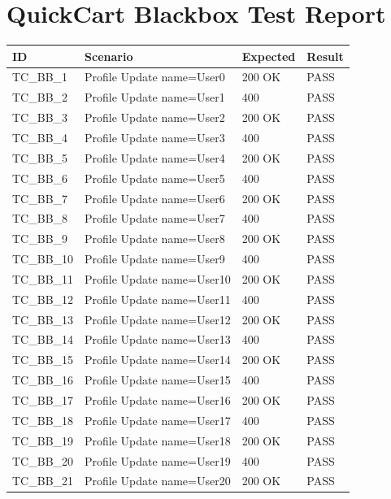 \documentclass{article}
\begin{document}
\section*{QuickCart Blackbox Test Report}

\begin{longtable}{|p{2cm}|p{8cm}|p{3cm}|p{2cm}|}
\hline
\textbf{ID} & \textbf{Scenario} & \textbf{Expected} & \textbf{Result} \\
\hline
\endhead
TC\_BB\_1 & Profile Update name=User0 & 200 OK & PASS \\
\hline
TC\_BB\_2 & Profile Update name=User1 & 400 & PASS \\
\hline
TC\_BB\_3 & Profile Update name=User2 & 200 OK & PASS \\
\hline
TC\_BB\_4 & Profile Update name=User3 & 400 & PASS \\
\hline
TC\_BB\_5 & Profile Update name=User4 & 200 OK & PASS \\
\hline
TC\_BB\_6 & Profile Update name=User5 & 400 & PASS \\
\hline
TC\_BB\_7 & Profile Update name=User6 & 200 OK & PASS \\
\hline
TC\_BB\_8 & Profile Update name=User7 & 400 & PASS \\
\hline
TC\_BB\_9 & Profile Update name=User8 & 200 OK & PASS \\
\hline
TC\_BB\_10 & Profile Update name=User9 & 400 & PASS \\
\hline
TC\_BB\_11 & Profile Update name=User10 & 200 OK & PASS \\
\hline
TC\_BB\_12 & Profile Update name=User11 & 400 & PASS \\
\hline
TC\_BB\_13 & Profile Update name=User12 & 200 OK & PASS \\
\hline
TC\_BB\_14 & Profile Update name=User13 & 400 & PASS \\
\hline
TC\_BB\_15 & Profile Update name=User14 & 200 OK & PASS \\
\hline
TC\_BB\_16 & Profile Update name=User15 & 400 & PASS \\
\hline
TC\_BB\_17 & Profile Update name=User16 & 200 OK & PASS \\
\hline
TC\_BB\_18 & Profile Update name=User17 & 400 & PASS \\
\hline
TC\_BB\_19 & Profile Update name=User18 & 200 OK & PASS \\
\hline
TC\_BB\_20 & Profile Update name=User19 & 400 & PASS \\
\hline
TC\_BB\_21 & Profile Update name=User20 & 200 OK & PASS \\

\end{longtable}
\end{document}
